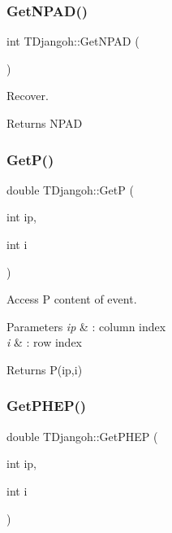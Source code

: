 \subsubsection{\texorpdfstring{Get\+N\+P\+A\+D()}{GetNPAD()}}
{\footnotesize\ttfamily int T\+Djangoh\+::\+Get\+N\+P\+AD (\begin{DoxyParamCaption}{ }\end{DoxyParamCaption})\hspace{0.3cm}{\ttfamily [inline]}}



Recover. 

\begin{DoxyReturn}{Returns}
N\+P\+AD 
\end{DoxyReturn}
\mbox{\label{class_t_djangoh_a2bc14d05d493e604f9f7fef847c19c9b}} 
\subsubsection{\texorpdfstring{Get\+P()}{GetP()}}
{\footnotesize\ttfamily double T\+Djangoh\+::\+GetP (\begin{DoxyParamCaption}\item[{int}]{ip,  }\item[{int}]{i }\end{DoxyParamCaption})\hspace{0.3cm}{\ttfamily [inline]}}



Access P content of event. 


\begin{DoxyParams}{Parameters}
{\em ip} & \+: column index \\
\hline
{\em i} & \+: row index \\
\hline
\end{DoxyParams}
\begin{DoxyReturn}{Returns}
P(ip,i) 
\end{DoxyReturn}
\mbox{\label{class_t_djangoh_acf17f3e8d6a10ebe25f57f75662a1817}} 
\subsubsection{\texorpdfstring{Get\+P\+H\+E\+P()}{GetPHEP()}}
{\footnotesize\ttfamily double T\+Djangoh\+::\+Get\+P\+H\+EP (\begin{DoxyParamCaption}\item[{int}]{ip,  }\item[{int}]{i }\end{DoxyParamCaption})}



